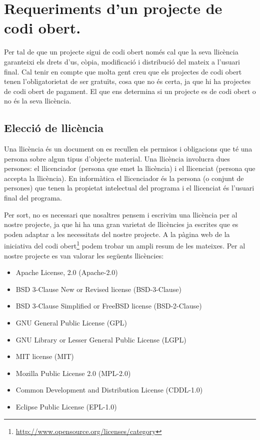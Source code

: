 \section{Requeriments d'un projecte de codi obert.}

Per tal de que un projecte sigui de codi obert només cal que la seva llicència garanteixi els drets  d'us, còpia,  modificació i distribució del mateix a l'usuari final. Cal tenir en compte que molta gent creu que els projectes de codi obert tenen l'obligatorietat de ser gratuïts, cosa que no és certa, ja que hi ha projectes de codi obert de pagament. El que ens determina si un projecte es de codi obert o no és la seva llicència. 

\subsection{Elecció de llicència}

Una llicència és un document on es recullen els permisos i obligacions que té una persona sobre algun tipus d'objecte material. Una llicència involucra dues persones: el llicenciador (persona que emet la llicència) i el llicenciat (persona que accepta la llicència). En informàtica el llicenciador és la persona (o conjunt de persones) que tenen la propietat intelectual del programa i el llicenciat és l'usuari final del programa. 

Per sort, no es necessari que nosaltres pensem i escrivim una llicència per al nostre projecte, ja que hi ha una gran varietat de llicències ja escrites que es poden adaptar a les necessitats del nostre projecte. A la pàgina web de la iniciativa del codi obert\footnote{\url{http://www.opensource.org/licenses/category}} podem trobar un ampli resum de les mateixes. Per al nostre projecte es van valorar les següents llicències: 

\begin{itemize}
\item{Apache License, 2.0 (Apache-2.0)}
\item{BSD 3-Clause New or Revised license (BSD-3-Clause)}
\item{BSD 3-Clause Simplified or FreeBSD license (BSD-2-Clause)}
\item{GNU General Public License (GPL)}
\item{GNU Library or Lesser General Public License (LGPL)}
\item{MIT license (MIT)}
\item{Mozilla Public License 2.0 (MPL-2.0)}
\item{Common Development and Distribution License (CDDL-1.0)}
\item{Eclipse Public License (EPL-1.0)}
\end{itemize}

